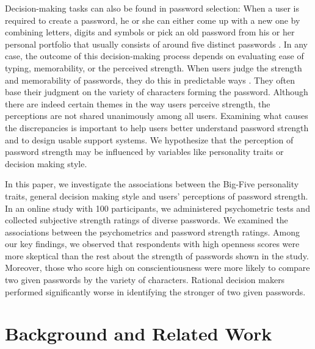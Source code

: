 
Decision-making tasks can also be found in password selection: When a user is required to create a password, he or she can either come up with a new one by combining letters, digits and symbols or pick an old password from his or her personal portfolio that usually consists of around five distinct passwords \cite{Florencio2007LargeScaleStudyPasswordHabits}. In any case, the outcome of this decision-making process depends on evaluating ease of typing, memorability, or the perceived strength. When users judge the strength and memorability of passwords, they do this in predictable ways \cite{Ur2016PerceptionsPassword}. They often base their judgment on the variety of characters forming the password. Although there are indeed certain themes in the way users perceive strength, the perceptions are not shared unanimously among all users. Examining what causes the discrepancies is important to help users better understand password strength and to design usable support systems. We hypothesize that the perception of password strength may be influenced by variables like personality traits or decision making style. 

In this paper, we investigate the associations between the Big-Five personality traits, general decision making style and users' perceptions of password strength. In an online study with 100 participants, we administered psychometric tests and collected subjective strength ratings of diverse passwords. We examined the associations between the psychometrics and password strength ratings. Among our key findings, we observed that respondents with high openness scores were more skeptical than the rest about the strength of passwords shown in the study. Moreover, those who score high on conscientiousness were more likely to compare two given passwords by the variety of characters. Rational decision makers performed significantly worse in identifying the stronger of two given passwords.



\section{Background and Related Work}
